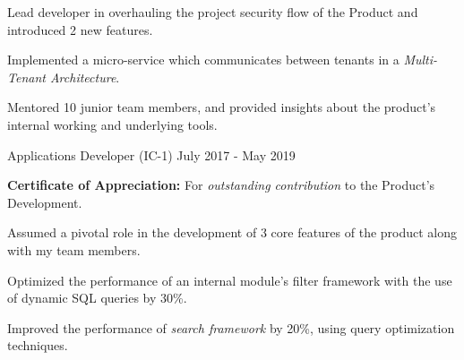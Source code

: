 \begin{cventries}
{\begin{cvitems}
        \item {Lead developer in overhauling the project security flow of the Product and introduced 2 new features.}
        \item {Implemented a micro-service which communicates between tenants in a \textit{Multi-Tenant Architecture}.}
        \item {Mentored 10 junior team members, and provided insights about the product's internal working and underlying tools.}
      \end{cvitems}
    }
  \cvexperiencecontinued
    {Applications Developer (IC-1)}
    {}
    {July 2017 - May 2019}
    {
      \begin{cvitems}
        \item {\textbf{Certificate of Appreciation:} For \textit{outstanding contribution} to the Product's Development.}
        \item {Assumed a pivotal role in the development of 3 core features of the product along with my team members.}
        \item {Optimized the performance of an internal module's filter framework with the use of dynamic SQL queries by 30\%.}
        \item {Improved the performance of \textit{search framework} by 20\%, using query optimization techniques.}
      \end{cvitems}
    }
\end{cventries}
